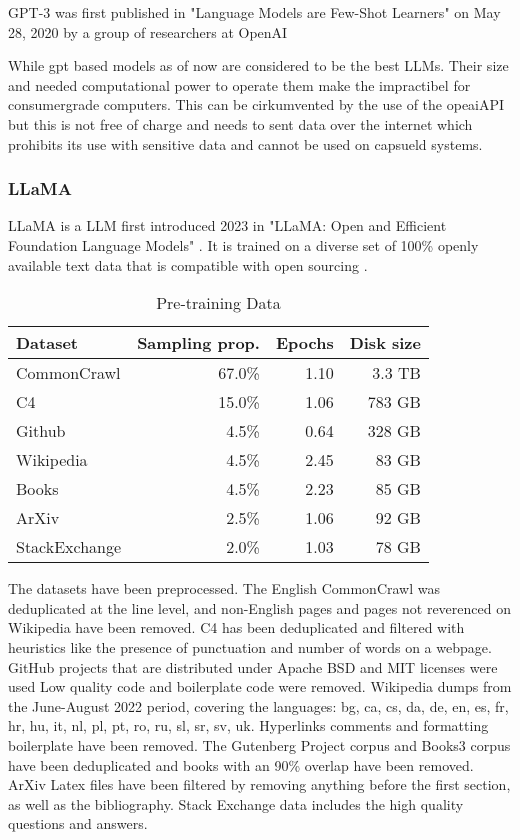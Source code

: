 GPT-3 was first published in "Language Models are Few-Shot Learners" on May 28, 2020
by a group of researchers at OpenAI

While gpt based models as of now are considered to be the best LLMs. Their size and needed computational power to operate them make the impractibel for consumergrade computers. This can be cirkumvented by the use of the opeaiAPI but this is not free of charge and needs to sent data over the internet which prohibits its use with sensitive data and cannot be used on capsueld systems. 

\subsubsection{LLaMA} 
LLaMA is a LLM first introduced 2023 in "LLaMA: Open and Efficient Foundation Language Models"\cite{touvron2023llama} . It is trained on a diverse set of  100\% openly available text data that is compatible with open sourcing\cite{touvron2023llama} .



\begin{table}[htbp]
\centering
\caption{Pre-training Data\cite{touvron2023llama}}
\begin{tabular}{|l|r|r|r|}
\hline
\textbf{Dataset} & \textbf{Sampling prop.} & \textbf{Epochs} & \textbf{Disk size} \\
\hline
CommonCrawl & 67.0\% & 1.10 & 3.3 TB \\
C4 & 15.0\% & 1.06 & 783 GB \\
Github & 4.5\% & 0.64 & 328 GB \\
Wikipedia & 4.5\% & 2.45 & 83 GB \\
Books & 4.5\% & 2.23 & 85 GB \\
ArXiv & 2.5\% & 1.06 & 92 GB \\
StackExchange & 2.0\% & 1.03 & 78 GB \\
\hline
\end{tabular}
\end{table}

The datasets have been preprocessed. The English CommonCrawl  was deduplicated at the line level, and non-English pages and pages not reverenced on Wikipedia have been removed. C4 has been deduplicated and filtered with heuristics like the presence of punctuation and number of words on a webpage. GitHub projects that are distributed under Apache BSD and MIT licenses were used Low quality code and boilerplate code were removed.
Wikipedia dumps from the June-August 2022 period, covering the languages: bg, ca, cs, da, de, en, es, fr, hr, hu, it, nl, pl, pt, ro, ru, sl, sr, sv, uk. Hyperlinks comments and formatting boilerplate have been removed. The Gutenberg Project corpus and Books3 corpus have been deduplicated and books with an 90\% overlap have been removed. 
ArXiv Latex files have been filtered by removing anything before the first section, as well as the bibliography. Stack Exchange data includes the high quality questions and answers. 




